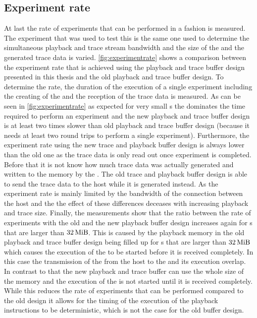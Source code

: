 \subsection{Experiment rate}\label{sec:rate}
At last the rate of experiments that can be performed in a \HWinTheLoop{} fashion is measured. The experiment that was used to test this is the same one used to determine the simultaneous playback and trace stream bandwidth and the size of the \PlaybackProgram{} and the generated trace data is varied. \autoref{fig:experimentrate} shows a comparison between the experiment rate that is achieved using the playback and trace buffer design presented in this thesis and the old playback and trace buffer design. To determine the rate, the duration of the execution of a single experiment including the creating of the \PlaybackProgram{} and the reception of the trace data is measured. As can be seen in \autoref{fig:experimentrate} as expected for very small \PlaybackProgram{}s the \rtt{} dominates the time required to perform an experiment and the new playback and trace buffer design is at least two times slower than old playback and trace buffer design (because it needs at least two round trips to perform a single experiment). Furthermore, the experiment rate using the new trace and playback buffer design is always lower than the old one as the trace data is only read out once experiment is completed. Before that it is not know how much trace data was actually generated and written to the \DDR{} memory by the \AXIDMA{}. The old trace and playback buffer design is able to send the trace data to the host while it is generated instead. As the experiment rate is mainly limited by the bandwidth of the connection between the host and the \FPGA{} the effect of these differences deceases with increasing playback and trace size.
Finally, the measurements show that the ratio between the rate of experiments with the old and the new playback buffer design increases again for \PlaybackProgram{}s that are larger than $\SI{32}{\mebi\byte}$. This is caused by the playback memory in the old playback and trace buffer design being filled up for \PlaybackProgram{}s that are larger than $\SI{32}{\mebi\byte}$ which causes the execution of the \PlaybackProgram{} to be started before it is received completely. In this case the transmission of the \PlaybackProgram{} from the host to the \FPGA{} and its execution overlap.
In contrast to that the new playback and trace buffer can use the whole size of the \DDR{} memory and the execution of the \PlaybackProgram{} is not started until it is received completely. While this reduces the rate of experiments that can be performed compared to the old design it allows for the timing of the execution of the playback instructions to be deterministic, which is not the case for the old buffer design.
